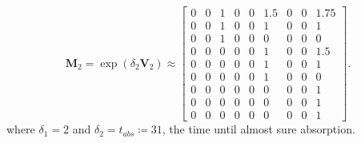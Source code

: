 \documentclass[hidelinks,11pt]{article}
\begin{document}
    \begin{equation*}
        \mathbf{M}_2 = \exp(\delta_2\mathbf{V}_2) \approx
        \left [
            \begin{array}{ccc|ccc|ccc}
                0 & 0 & 1 & 0 & 0 & 1.5 & 0 & 0 & 1.75 \\
                0 & 0 & 1 & 0 & 0 & 1   & 0 & 0 & 1    \\
                0 & 0 & 1 & 0 & 0 & 0   & 0 & 0 & 0    \\
                \hline
                0 & 0 & 0 & 0 & 0 & 1   & 0 & 0 & 1.5  \\
                0 & 0 & 0 & 0 & 0 & 1   & 0 & 0 & 1    \\
                0 & 0 & 0 & 0 & 0 & 1   & 0 & 0 & 0    \\
                \hline
                0 & 0 & 0 & 0 & 0 & 0   & 0 & 0 & 1    \\
                0 & 0 & 0 & 0 & 0 & 0   & 0 & 0 & 1    \\
                0 & 0 & 0 & 0 & 0 & 0   & 0 & 0 & 1
            \end{array}
            \right ].
    \end{equation*}
    where $\delta_1 = 2$ and $\delta_2 = t_{abs} \coloneqq 31$, the time until almost sure absorption.
\end{document}
